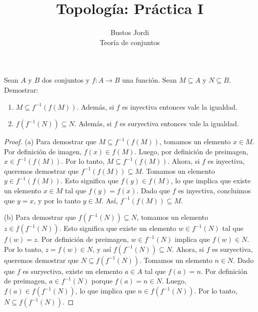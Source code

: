 \documentclass{article}
\theoremstyle{definition}
\newenvironment{ejercicio}[1]{\begin{trivlist}
\item[\hskip \labelsep {\bfseries Ejercicio}\hskip \labelsep {\bfseries #1.}]}{\end{trivlist}}
\begin{document}
\title{Topología: Práctica I}
\author{Bustos Jordi\\Teoría de conjuntos}

\maketitle

\begin{ejercicio}{1}
    Sean \(A\) y \(B\) dos conjuntos y \( f:A\rightarrow B\) una función. Sean \( M\subseteq A\) y \(N\subseteq B\). Demostrar:
    \begin{enumerate}
        \item \(M\subseteq f^{-1}(f(M))\). Además, si \(f\) es inyectiva entonces vale la igualdad.
        \item \(f(f^{-1}(N))\subseteq N\). Además, si \(f\) es suryectiva entonces vale la igualdad.
    \end{enumerate}
\end{ejercicio}

\begin{proof}
    (a) Para demostrar que \(M\subseteq f^{-1}(f(M))\), tomamos un elemento \(x \in M\). Por definición de imagen, \(f(x) \in f(M)\). Luego, por definición de preimagen, \(x \in f^{-1}(f(M))\). Por lo tanto, \(M \subseteq f^{-1}(f(M))\).
    Ahora, si \(f\) es inyectiva, queremos demostrar que \(f^{-1}(f(M)) \subseteq M\). Tomamos un elemento \(y \in f^{-1}(f(M))\). Esto significa que \(f(y) \in f(M)\), lo que implica que existe un elemento \(x \in M\) tal que \(f(y) = f(x)\). Dado que \(f\) es inyectiva, concluimos que \(y = x\), y por lo tanto \(y \in M\). Así, \(f^{-1}(f(M)) \subseteq M\).

    (b) Para demostrar que \(f(f^{-1}(N))\subseteq N\), tomamos un elemento \(z \in f(f^{-1}(N))\). Esto significa que existe un elemento \(w \in f^{-1}(N)\) tal que \(f(w) = z\). Por definición de preimagen, \(w \in f^{-1}(N)\) implica que \(f(w) \in N\). Por lo tanto, \(z = f(w) \in N\), y así \(f(f^{-1}(N)) \subseteq N\).
    Ahora, si \(f\) es suryectiva, queremos demostrar que \(N \subseteq f(f^{-1}(N))\). Tomamos un elemento \(n \in N\). Dado que \(f\) es suryectiva, existe un elemento \(a \in A\) tal que \(f(a) = n\). Por definición de preimagen, \(a \in f^{-1}(N)\) porque \(f(a) = n \in N\). Luego, \(f(a) \in f(f^{-1}(N))\), lo que implica que \(n \in f(f^{-1}(N))\). Por lo tanto, \(N \subseteq f(f^{-1}(N))\).
\end{proof}
\end{document}
